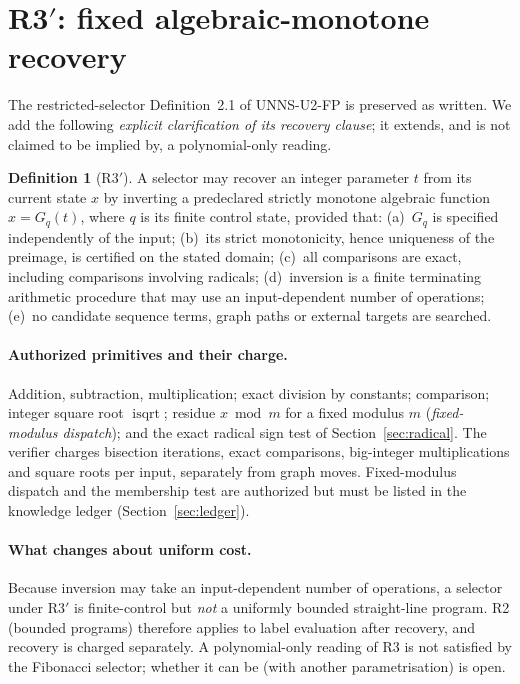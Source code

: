 \documentclass[11pt]{article}
\theoremstyle{definition}
\newtheorem{definition}[theorem]{Definition}
\theoremstyle{remark}
\DeclareMathOperator{\isqrt}{isqrt}
\begin{document}
\section{R3$'$: fixed algebraic-monotone recovery}
The restricted-selector Definition~2.1 of UNNS-U2-FP is preserved as written. We add the following \emph{explicit clarification of its recovery clause}; it extends, and is not claimed to be implied by, a polynomial-only reading.

\begin{definition}[R3$'$]\label{def:r3}
A selector may recover an integer parameter $t$ from its current state $x$ by inverting a predeclared strictly monotone algebraic function $x=G_q(t)$, where $q$ is its finite control state, provided that: (a)~$G_q$ is specified independently of the input; (b)~its strict monotonicity, hence uniqueness of the preimage, is certified on the stated domain; (c)~all comparisons are exact, including comparisons involving radicals; (d)~inversion is a finite terminating arithmetic procedure that may use an input-dependent number of operations; (e)~no candidate sequence terms, graph paths or external targets are searched.
\end{definition}

\paragraph{Authorized primitives and their charge.} Addition, subtraction, multiplication; exact division by constants; comparison; integer square root $\isqrt$; residue $x\bmod m$ for a fixed modulus $m$ (\emph{fixed-modulus dispatch}); and the exact radical sign test of Section~\ref{sec:radical}. The verifier charges bisection iterations, exact comparisons, big-integer multiplications and square roots per input, separately from graph moves. Fixed-modulus dispatch and the membership test are authorized but must be listed in the knowledge ledger (Section~\ref{sec:ledger}).

\paragraph{What changes about uniform cost.} Because inversion may take an input-dependent number of operations, a selector under R3$'$ is finite-control but \emph{not} a uniformly bounded straight-line program. R2 (bounded programs) therefore applies to label evaluation after recovery, and recovery is charged separately. A polynomial-only reading of R3 is not satisfied by the Fibonacci selector; whether it can be (with another parametrisation) is open.
\end{document}
